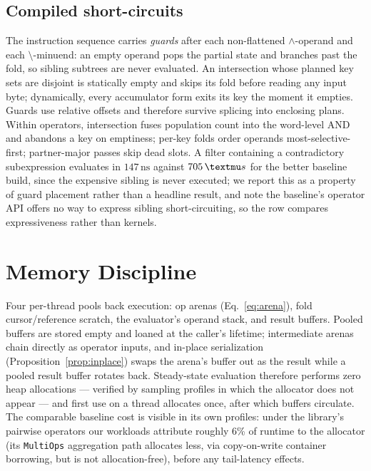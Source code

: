 \documentclass[sigconf,nonacm]{acmart}
\newcommand{\us}{\,\textmu s}
\newcommand{\nsu}{\,\text{ns}}
\begin{document}
\subsection{Compiled short-circuits}

The instruction sequence carries \emph{guards} after each non-flattened
$\wedge$-operand and each $\setminus$-minuend: an empty operand pops the
partial state and branches past the fold, so sibling subtrees are never
evaluated. An intersection whose planned key sets are disjoint is
statically empty and skips its fold before reading any input byte;
dynamically, every accumulator form exits its key the moment it
empties. Guards use relative offsets and therefore survive splicing
into enclosing plans. Within operators, intersection fuses population
count into the word-level AND and abandons a key on emptiness; per-key
folds order operands most-selective-first; partner-major passes skip
dead slots. A filter containing a contradictory subexpression evaluates
in $147\nsu$ against $705\us$ for the better baseline build, since
the expensive sibling is never executed; we report this as a property
of guard
placement rather than a headline result, and note the baseline's
operator API offers no way to express sibling short-circuiting, so the
row compares expressiveness rather than kernels.

\section{Memory Discipline}
\label{sec:memory}

Four per-thread pools back execution: op arenas (Eq.~\ref{eq:arena}),
fold cursor/reference scratch, the evaluator's operand stack, and result
buffers. Pooled buffers are stored empty and loaned at the caller's
lifetime; intermediate arenas chain directly as operator inputs, and
in-place serialization (Proposition~\ref{prop:inplace}) swaps the
arena's buffer out as the result while a pooled result buffer rotates
back. Steady-state evaluation therefore performs zero heap allocations
--- verified by sampling profiles in which the allocator does not
appear --- and first use on a thread allocates once, after which
buffers circulate. The comparable baseline cost is visible in its own
profiles: under the library's pairwise operators our workloads
attribute roughly 6\% of runtime to the allocator (its \texttt{MultiOps}
aggregation path allocates less, via copy-on-write container borrowing,
but is not allocation-free), before any tail-latency effects.
\end{document}
